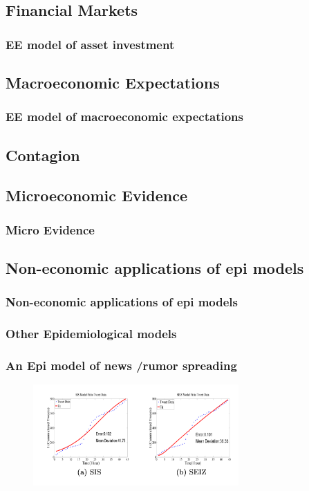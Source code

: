 \documentclass[pdflatex]{beamer}
\begin{document}
\subsection{Financial Markets}\label{subsec:assetprice}

\begin{frame}
	\frametitle{EE model of asset investment}

\end{frame}

\subsection{Macroeconomic Expectations}\label{subsec:macroExp}

\begin{frame}
	\frametitle{EE model of macroeconomic expectations}

\end{frame}

\subsection{Contagion}\label{subsec:Contagion}

\subsection{Microeconomic Evidence}\label{subsec:microEvidence}


\begin{frame}
	\frametitle{Micro Evidence}
\end{frame}

\subsection{Non-economic applications of epi models}
\begin{frame}
	\frametitle{Non-economic applications of epi models}
\end{frame}
\begin{frame}
	\frametitle{Other Epidemiological models}

\end{frame}


\begin{frame}
	\frametitle{An Epi model of news /rumor spreading}
\begin{figure}[!ht] \centering  %
	\caption{ ~\href{https://people.cs.vt.edu/ramakris/papers/news-rumor-epi-snakdd13.pdf}{\cite{jin2013epidemiological}}}
	\label{fig:news_curve}
	\centerline{\includegraphics[width=0.7\textwidth]{./figures/Obama.png}}
\end{figure}
\end{frame}
\end{document}
